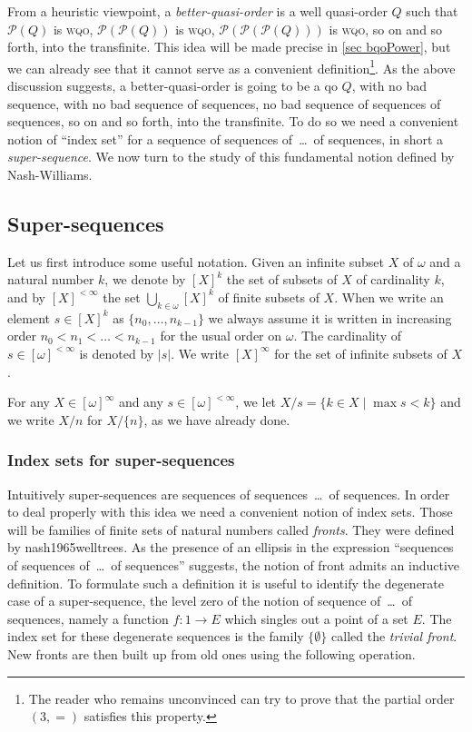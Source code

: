 \documentclass{article}%
\newcommand\textcite{}
\theoremstyle{plain}
\theoremstyle{definition}
\theoremstyle{remark}
\newcommand{\wqo}{\textsc{wqo}}
\newcommand{\finSub}[1] {[#1]^{<\infty}}
\newcommand{\infSub}[1]{[#1]^{\infty}}
\begin{document}
From a heuristic viewpoint, a \emph{better-quasi-order} is a well quasi-order $Q$ such that $\mathcal{P}(Q)$ is \wqo{}, $\mathcal{P}(\mathcal{P}(Q))$ is \wqo{}, $\mathcal{P}(\mathcal{P}(\mathcal{P}(Q)))$ is \wqo{}, so on and so forth, into the transfinite. This idea will be made precise in \cref{sec bqoPower}, but we can already see that it cannot serve as a convenient definition\footnote{The reader who remains unconvinced can try to prove that the partial order $(3,=)$ satisfies this property.}. As the above discussion suggests, a better-quasi-order is going to be a qo $Q$, with no bad sequence, with no bad sequence of sequences, no bad sequence of sequences of sequences, so on and so forth, into the transfinite. To do so we need a convenient notion of \enquote{index set} for a sequence of sequences of~\dots\ of sequences, in short a \emph{super-sequence}. We now turn to the study of this fundamental notion defined by Nash-Williams.

\subsection{Super-sequences}

Let us first introduce some useful notation.  Given an infinite subset $X$ of $\omega$ and a natural number $k$, we denote by $[X]^{k}$ the set of subsets of $X$ of cardinality $k$, and by $\finSub{X}$ the set $\bigcup_{k\in\omega}[X]^{k}$ of finite subsets of $X$. When we write an element $s\in [X]^{k}$ as $\{n_{0},\ldots,n_{k-1}\}$ we always assume it is written in increasing order $n_{0}<n_{1}<\ldots< n_{k-1}$ for the usual order on $\omega$. The cardinality of $s\in\finSub{\omega}$ is denoted by $|s|$. We write $\infSub{X}$ for the set of infinite subsets of $X$.

For any $X\in \infSub{ \omega}$ and any $s\in\finSub{\omega}$, we let $X/s=\{k\in X\mid \max s<k\}$ and we write $X/n$ for $X/\{n\}$, as we have already done. 


\subsubsection{Index sets for super-sequences}

Intuitively super-sequences are sequences of sequences~\dots\ of sequences. In order to deal properly with this idea we need a convenient notion of index sets. Those will be families of finite sets of natural numbers called \emph{fronts}. They were defined by \textcite{nash1965welltrees}. As the presence of an ellipsis in the expression \enquote{sequences of sequences of~\dots\ of sequences} suggests, the notion of front admits an inductive definition. To formulate such a definition it is useful to identify the degenerate case of a super-sequence, the level zero of the notion of sequence of~\dots\ of sequences, namely a function $f:1\to E$ which singles out a point of a set $E$. The index set for these degenerate sequences is the family $\{\emptyset\}$ called the \emph{trivial front}. New fronts are then built up from old ones using the following operation. 
\end{document}
